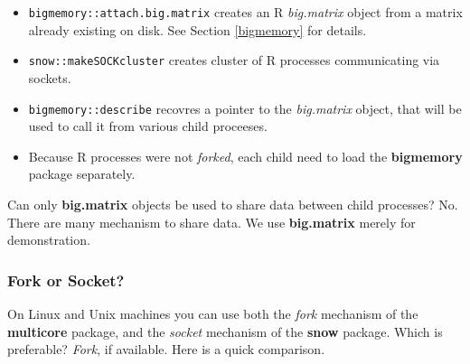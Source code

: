 \documentclass[]{book}
\newenvironment{Shaded}{\begin{snugshade}}{\end{snugshade}}
\newcommand{\CommentTok}[1]{\textcolor[rgb]{0.56,0.35,0.01}{\textit{#1}}}
\newcommand{\ControlFlowTok}[1]{\textcolor[rgb]{0.13,0.29,0.53}{\textbf{#1}}}
\newcommand{\DataTypeTok}[1]{\textcolor[rgb]{0.13,0.29,0.53}{#1}}
\newcommand{\DecValTok}[1]{\textcolor[rgb]{0.00,0.00,0.81}{#1}}
\newcommand{\KeywordTok}[1]{\textcolor[rgb]{0.13,0.29,0.53}{\textbf{#1}}}
\newcommand{\NormalTok}[1]{#1}
\newcommand{\OperatorTok}[1]{\textcolor[rgb]{0.81,0.36,0.00}{\textbf{#1}}}
\newcommand{\OtherTok}[1]{\textcolor[rgb]{0.56,0.35,0.01}{#1}}
\newcommand{\StringTok}[1]{\textcolor[rgb]{0.31,0.60,0.02}{#1}}
\providecommand{\tightlist}{%
  \setlength{\itemsep}{0pt}\setlength{\parskip}{0pt}}
\theoremstyle{definition}
\theoremstyle{definition}
\theoremstyle{definition}
\theoremstyle{remark}
\begin{document}
\begin{itemize}
\tightlist
\item
  \texttt{bigmemory::attach.big.matrix} creates an R \emph{big.matrix} object from a matrix already existing on disk. See Section \ref{bigmemory} for details.
\item
  \texttt{snow::makeSOCKcluster} creates cluster of R processes communicating via sockets.
\item
  \texttt{bigmemory::describe} recovres a pointer to the \emph{big.matrix} object, that will be used to call it from various child proceeses.
\item
  Because R processes were not \emph{forked}, each child need to load the \textbf{bigmemory} package separately.
\end{itemize}

Can only \textbf{big.matrix} objects be used to share data between child processes?
No.
There are many mechanism to share data.
We use \textbf{big.matrix} merely for demonstration.

\hypertarget{fork-or-socket}{%
\subsubsection{Fork or Socket?}\label{fork-or-socket}}

On Linux and Unix machines you can use both the \emph{fork} mechanism of the \textbf{multicore} package, and the \emph{socket} mechanism of the \textbf{snow} package.
Which is preferable? \emph{Fork}, if available.
Here is a quick comparison.

\begin{Shaded}
\end{Shaded}
\end{document}
